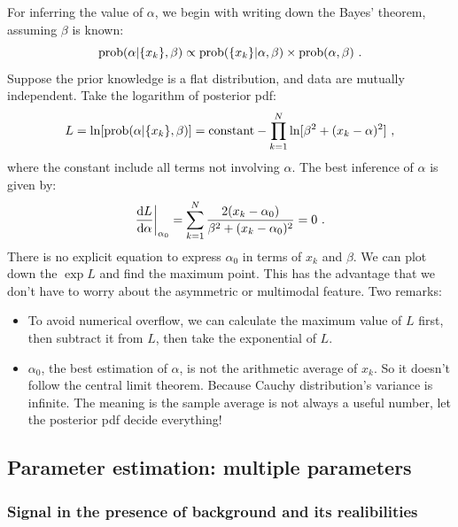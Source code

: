 \documentclass[11pt, a4paper]{article}
\begin{document}
For inferring the value of $\alpha$, we begin with writing down the Bayes' theorem, assuming $\beta$ is known:
\begin{equation}
{\rm prob}(\alpha|\{x_k\},\beta) \propto {\rm prob}(\{x_k\}|\alpha,\beta) \times {\rm prob}(\alpha,\beta)~.  
\end{equation}
Suppose the prior knowledge is a flat distribution, and data are mutually independent. Take the logarithm of posterior pdf:
\begin{equation}
L=\ln [{\rm prob}(\alpha|\{x_k\},\beta)]={\rm constant}-\prod_{k=1}^N \ln [\beta^2+(x_k-\alpha)^2]~,
\end{equation}
where the constant include all terms not involving $\alpha$. The best inference of $\alpha$ is given by:
\begin{equation}
\frac{{\rm d}L}{{\rm d}\alpha} \bigg | _{\alpha_0}=\sum_{k=1}^{N}\frac{2(x_k-\alpha_0)}{\beta^2+(x_k-\alpha_0)^2 }=0~.
\end{equation}
There is no explicit equation to express $\alpha_0$ in terms of $x_k$ and $\beta$. We can plot down the $\exp L$ and find the maximum point. This has the advantage that we don't have to worry about the asymmetric or multimodal feature. Two remarks:
\begin{itemize}
\item To avoid numerical overflow, we can calculate the maximum value of $L$ first, then subtract it from $L$, then take the exponential of $L$. 
\item $\alpha_0$, the best estimation of $\alpha$, is not the arithmetic average of ${x_k}$. So it doesn't follow the central limit theorem. Because Cauchy distribution's variance is infinite. The meaning is the sample average is not always a useful number, let the posterior pdf decide everything!
\end{itemize}

\subsection{Parameter estimation: multiple parameters}
\subsubsection{Signal in the presence of background and its realibilities}
\quad
\end{document}
